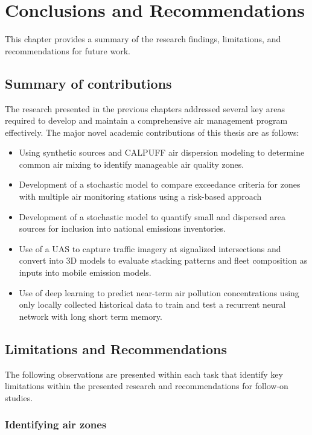 \chapter{Conclusions and Recommendations}
This chapter provides a summary of the research findings, limitations, and recommendations for future work.

\section{Summary of contributions}

The research presented in the previous chapters addressed several key areas required to develop and maintain a comprehensive air management program effectively. The major novel academic contributions of this thesis are as follows:

\begin{itemize}
\item {Using synthetic sources and CALPUFF air dispersion modeling to determine common air mixing to identify manageable air quality zones.}
\item {Development of a stochastic model to compare exceedance criteria for zones with multiple air monitoring stations using a risk-based approach}
\item{Development of a stochastic model to quantify small and dispersed area sources for inclusion into national emissions inventories.}
\item{Use of a UAS to capture traffic imagery at signalized intersections and convert into 3D models to evaluate stacking patterns and fleet composition as inputs into mobile emission models}.
\item{Use of deep learning to predict near-term air pollution concentrations using only locally collected historical data to train and test a recurrent neural network with long short term memory.}
\end{itemize}


\section{Limitations and Recommendations}

The following observations are presented within each task that identify key limitations within the presented research and recommendations for follow-on studies.

\noindent
\subsection*{Identifying air zones}

